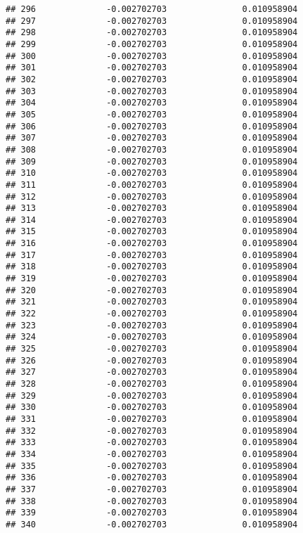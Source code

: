 \documentclass[]{article}
\begin{document}
\begin{verbatim}
## 296              -0.002702703               0.010958904
## 297              -0.002702703               0.010958904
## 298              -0.002702703               0.010958904
## 299              -0.002702703               0.010958904
## 300              -0.002702703               0.010958904
## 301              -0.002702703               0.010958904
## 302              -0.002702703               0.010958904
## 303              -0.002702703               0.010958904
## 304              -0.002702703               0.010958904
## 305              -0.002702703               0.010958904
## 306              -0.002702703               0.010958904
## 307              -0.002702703               0.010958904
## 308              -0.002702703               0.010958904
## 309              -0.002702703               0.010958904
## 310              -0.002702703               0.010958904
## 311              -0.002702703               0.010958904
## 312              -0.002702703               0.010958904
## 313              -0.002702703               0.010958904
## 314              -0.002702703               0.010958904
## 315              -0.002702703               0.010958904
## 316              -0.002702703               0.010958904
## 317              -0.002702703               0.010958904
## 318              -0.002702703               0.010958904
## 319              -0.002702703               0.010958904
## 320              -0.002702703               0.010958904
## 321              -0.002702703               0.010958904
## 322              -0.002702703               0.010958904
## 323              -0.002702703               0.010958904
## 324              -0.002702703               0.010958904
## 325              -0.002702703               0.010958904
## 326              -0.002702703               0.010958904
## 327              -0.002702703               0.010958904
## 328              -0.002702703               0.010958904
## 329              -0.002702703               0.010958904
## 330              -0.002702703               0.010958904
## 331              -0.002702703               0.010958904
## 332              -0.002702703               0.010958904
## 333              -0.002702703               0.010958904
## 334              -0.002702703               0.010958904
## 335              -0.002702703               0.010958904
## 336              -0.002702703               0.010958904
## 337              -0.002702703               0.010958904
## 338              -0.002702703               0.010958904
## 339              -0.002702703               0.010958904
## 340              -0.002702703               0.010958904

\end{verbatim}
\end{document}
